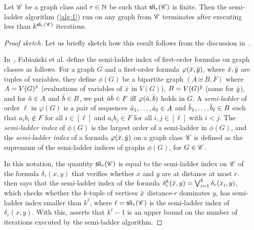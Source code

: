 \begin{theorem}\label{thm:termination}
	Let $\mathscr C$ be a graph class and $r\in \mathbb{N}$ be such that $\mathsf{sli}_r(\mathscr C)$ is finite. Then the semi-ladder algorithm (\cref{alg:1}) run on any graph from $\mathscr C$ terminates after executing less than $k^{\mathsf{sli}_r(\mathscr C)}$ iterations.
\end{theorem}
\begin{proof}[Proof sketch]
Let us briefly sketch how this result follows from the discussion in~\cite{Fabianski2018arxiv}.

In~\cite{Fabianski2018arxiv}, Fabia\'nski et al. define the semi-ladder index of first-order formulas on graph classes as follows. For a graph $G$ and a first-order formula $\varphi({\bar{x}},{\bar{y}})$, where ${\bar{x}},{\bar{y}}$ are tuples of variables, they define $\phi(G)$ be a bipartite graph $(A \uplus B, F)$ where $A=V(G)^{{\bar{x}}}$ (evaluations of variables of ${\bar{x}}$ in $V(G)$), $B=V(G)^{{\bar{y}}}$ (same for ${\bar{y}}$), and for ${\bar{a}}\in A$ and ${\bar{b}}\in B$, we put ${\bar{a}}{\bar{b}} \in F$ iff $\varphi({\bar{a}},{\bar{b}})$ holds in $G$.
A \emph{semi-ladder} of order $\ell$ in $\varphi(G)$ is a pair of sequences ${\bar{a}}_1,\ldots,{\bar{a}}_\ell\in A$ and ${\bar{b}}_1,\ldots,{\bar{b}}_\ell\in B$ such that $a_ib_i\notin F$ for all $i\in [\ell]$ and $a_ib_j\in F$ for all $i,j\in [\ell]$ with $i<j$. The \emph{semi-ladder index} of $\phi(G)$ is the largest order of a semi-ladder in $\phi(G)$, and the \emph{semi-ladder index} of a formula $\varphi({\bar{x}},{\bar{y}})$ on a graph class $\mathscr C$ is defined as the supremum of the semi-ladder indices of graphs $\phi(G)$, for $G\in\mathscr C$.

In this notation, the quantity $\mathsf{sli}_r(\mathscr C)$ is equal to the semi-ladder index on $\mathscr C$ of the formula $\delta_r(x,y)$ that verifies whether $x$ and $y$ are at distance at most $r$. \cite[Lemma~5]{Fabianski2018arxiv} then says that the semi-ladder index of the formula $\delta^k_r({\bar{x}},y)=\bigvee_{i=1}^k \delta_r(x_i,y)$, which checks whether the $k$-tuple of vertices ${\bar{x}}$ distance-$r$ dominates $y$, has semi-ladder index smaller than $k^\ell$, where $\ell=\mathsf{sli}_r(\mathscr C)$ is the semi-ladder index of $\delta_r(x,y)$. With this, \cite[Corollary~13]{Fabianski2018arxiv} asserts that $k^\ell-1$ is an upper bound on the number of iterations executed by the semi-ladder algorithm.
\end{proof}



